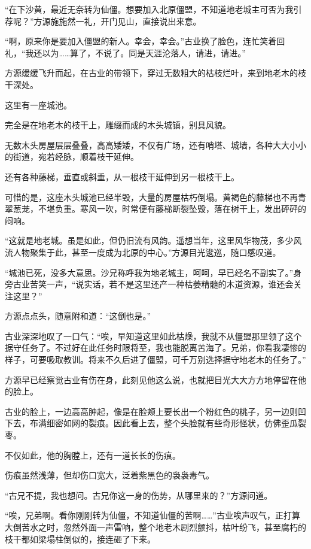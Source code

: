 \begin{this_body}
“在下沙黄，最近无奈转为仙僵。想要加入北原僵盟，不知道地老城主可否为我引荐呢？”方源施施然一礼，开门见山，直接说出来意。

“啊，原来你是要加入僵盟的新人。幸会，幸会。”古业换了脸色，连忙笑着回礼，“我还以为……算了，不说了。同是天涯沦落人，请进，请进。”

方源缓缓飞升而起，在古业的带领下，穿过无数粗大的枯枝烂叶，来到地老木的枝干深处。

这里有一座城池。

完全是在地老木的枝干上，雕缀而成的木头城镇，别具风貌。

无数木头房屋层层叠叠，高高矮矮，不仅有广场，还有哨塔、城墙，各种大大小小的街道，宛若经脉，顺着枝干延伸。

还有各种藤梯，垂直或斜垂，从一根枝干延伸到另一根枝干上。

可惜的是，这座木头城池已经半毁，大量的房屋枯朽倒塌。黄褐色的藤梯也不再青翠葱茏，不堪负重。寒风一吹，时常便有藤梯断裂坠毁，落在树干上，发出砰砰的闷响。

“这就是地老城。虽是如此，但仍旧流有风韵。遥想当年，这里风华物茂，多少风流人物聚集于此，甚至一度成为北原的中心。”方源目光逡巡，随口感叹道。

“城池已死，没多大意思。沙兄称呼我为地老城主，呵呵，早已经名不副实了。”身旁古业苦笑一声，“说实话，若不是这里还产一种枯萎精髓的木道资源，谁还会关注这里？”

方源点点头，随意附和道：“这倒也是。”

古业深深地叹了一口气：“唉，早知道这里如此枯燥，我就不从僵盟那里领了这个据守任务了。不过好在此任务时限将至，我也能脱离苦海了。兄弟，你看我凄惨的样子，可要吸取教训。将来不久后进了僵盟，可千万别选择据守地老木的任务了。”

方源早已经察觉古业有伤在身，此刻见他这么说，也就把目光大大方方地停留在他的脸上。

古业的脸上，一边高高肿起，像是在脸颊上要长出一个粉红色的桃子，另一边则凹下去，布满细密如网的裂痕。因此看上去，整个头脸就有些奇形怪状，仿佛歪瓜裂枣。

不仅如此，他的胸膛上，还有一道长长的伤痕。

伤痕虽然浅薄，但却伤口宽大，泛着紫黑色的袅袅毒气。

“古兄不提，我也想问。古兄你这一身的伤势，从哪里来的？”方源问道。

“唉，兄弟啊。看你刚刚转为仙僵，不知道仙僵的苦啊……”古业唉声叹气，正打算大倒苦水之时，忽然外面一声雷响，整个地老木剧烈颤抖，枯叶纷飞，甚至腐朽的枝干都如梁塌柱倒似的，接连砸了下来。


\end{this_body}
